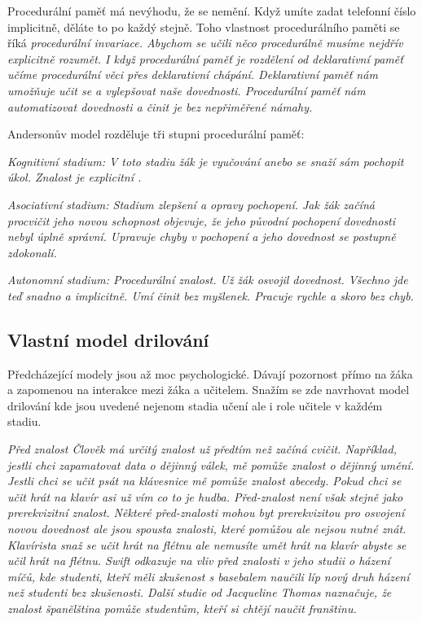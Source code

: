 Procedurální paměť má nevýhodu, že se nemění.  Když umíte zadat telefonní číslo implicitně, děláte to po každý stejně.  Toho vlastnost procedurálního paměti se říká \em procedurální invariace\em . Abychom se učili něco procedurálně musíme nejdřív explicitně rozumět.  I když procedurální paměť je rozdělení od deklarativní paměť učíme procedurální věci přes deklarativní chápání.  Deklarativní paměť nám umožňuje učit se a vylepšovat naše dovednosti.  Procedurální paměť nám automatizovat dovednosti a činit je bez nepřiměřené námahy\citep[str. 105]{robert1994handbook}.

Andersonův model rozděluje tři stupni procedurální paměť:

\em Kognitivní stadium\em : V toto stadiu žák je vyučování anebo se snaží sám pochopit úkol.  Znalost je explicitní .

\em Asociativní stadium\em : Stadium zlepšení a opravy pochopení.  Jak žák začíná procvičit jeho novou schopnost objevuje, že jeho původní pochopení dovednosti nebyl úplně správní.  Upravuje chyby v pochopení a jeho dovednost se postupně zdokonalí.

\em Autonomní stadium\em : Procedurální znalost.  Už žák osvojil dovednost. Všechno jde teď snadno a implicitně.  Umí činit bez myšlenek. Pracuje rychle a skoro bez chyb\citep{o1987some}.

\subsection{Vlastní model drilování}

Předcházející modely jsou až moc psychologické.  Dávají pozornost přímo na žáka a zapomenou na interakce mezi žáka a učitelem.  Snažím se zde navrhovat model drilování kde jsou uvedené nejenom stadia učení ale i role učitele v každém stadiu.

\em Před znalost \em Člověk má určitý znalost už předtím než začíná cvičit. Například, jestli chci zapamatovat data o dějinný válek, mě pomůže znalost o dějinný umění.  Jestli chci se učit psát na klávesnice mě pomůže znalost abecedy. Pokud chci se učit hrát na klavír asi už vím co to je hudba.  Před-znalost není však stejně jako prerekvizitní znalost.  Některé před-znalosti mohou byt prerekvizitou pro osvojení novou dovednost ale jsou spousta znalosti, které pomůžou ale nejsou nutné znát.  Klavírista snaž se učit hrát na flétnu ale nemusíte umět hrát na klavír abyste se učil hrát na flétnu.  Swift odkazuje na vliv před znalosti v jeho studii o házení míčů, kde studenti, kteří měli zkušenost s basebalem naučili líp nový druh házení než studenti bez zkušenosti. Další studie od Jacqueline Thomas naznačuje, že znalost španělština pomůže studentům, kteří si chtějí naučit franštinu\citep{swift1903studies,thomas1988role}.

